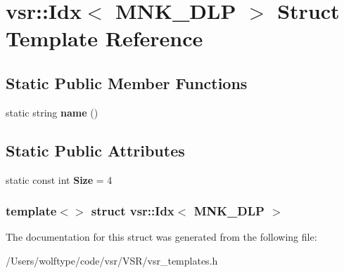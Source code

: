 \hypertarget{structvsr_1_1_idx_3_01_m_n_k___d_l_p_01_4}{\section{vsr\-:\-:Idx$<$ M\-N\-K\-\_\-\-D\-L\-P $>$ Struct Template Reference}
\label{structvsr_1_1_idx_3_01_m_n_k___d_l_p_01_4}
}
\subsection*{Static Public Member Functions}
\begin{DoxyCompactItemize}
\item 
\hypertarget{structvsr_1_1_idx_3_01_m_n_k___d_l_p_01_4_a11c16715e8c87ff8ce5369ffd9ca9c3e}{static string {\bfseries name} ()}\label{structvsr_1_1_idx_3_01_m_n_k___d_l_p_01_4_a11c16715e8c87ff8ce5369ffd9ca9c3e}

\end{DoxyCompactItemize}
\subsection*{Static Public Attributes}
\begin{DoxyCompactItemize}
\item 
\hypertarget{structvsr_1_1_idx_3_01_m_n_k___d_l_p_01_4_ab73b28ab35f6992dd93627284eb8c0c4}{static const int {\bfseries Size} = 4}\label{structvsr_1_1_idx_3_01_m_n_k___d_l_p_01_4_ab73b28ab35f6992dd93627284eb8c0c4}

\end{DoxyCompactItemize}
\subsubsection*{template$<$$>$ struct vsr\-::\-Idx$<$ M\-N\-K\-\_\-\-D\-L\-P $>$}



The documentation for this struct was generated from the following file\-:\begin{DoxyCompactItemize}
\item 
/\-Users/wolftype/code/vsr/\-V\-S\-R/vsr\-\_\-templates.\-h\end{DoxyCompactItemize}
